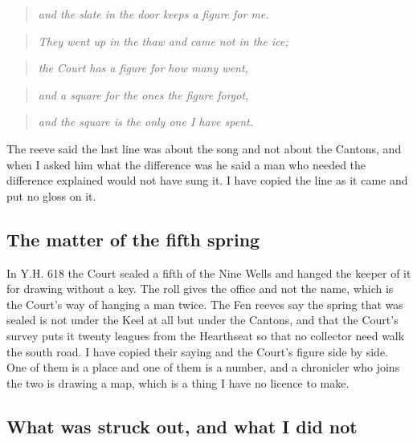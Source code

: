 \documentclass{design/chronicle}
\begin{document}
\begin{quote}\itshape and the slate in the door keeps a figure for me.\end{quote}

\begin{quote}\itshape \end{quote}

\begin{quote}\itshape They went up in the thaw and came not in the ice;\end{quote}

\begin{quote}\itshape the Court has a figure for how many went,\end{quote}

\begin{quote}\itshape and a square for the ones the figure forgot,\end{quote}

\begin{quote}\itshape and the square is the only one I have spent.\end{quote}

The reeve said the last line was about the song and not about the Cantons, and when I asked him what the difference was he said a man who needed the difference explained would not have sung it. I have copied the line as it came and put no gloss on it.

\subsection*{The matter of the fifth spring}

In Y.H. 618 the Court sealed a fifth of the Nine Wells and hanged the keeper of it for drawing without a key. The roll gives the office and not the name, which is the Court’s way of hanging a man twice. The Fen reeves say the spring that was sealed is not under the Keel at all but under the Cantons, and that the Court’s survey puts it twenty leagues from the Hearthseat so that no collector need walk the south road. I have copied their saying and the Court’s figure side by side. One of them is a place and one of them is a number, and a chronicler who joins the two is drawing a map, which is a thing I have no licence to make.

\subsection*{What was struck out, and what I did not}
\end{document}
